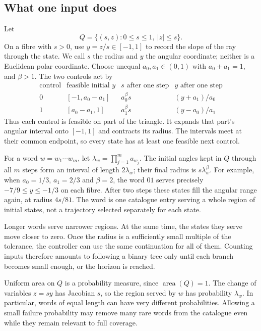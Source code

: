 \documentclass[11pt]{amsart}
\theoremstyle{definition}
\theoremstyle{remark}
\newcommand{\area}{\operatorname{area}}
\numberwithin{equation}{section}
\begin{document}
\subsection{What one input does}
Let
\[
Q=\{(s,z):0\le s\le1,\ |z|\le s\}.
\]
On a fibre with $s>0$, use $y=z/s\in[-1,1]$ to record the
slope of the ray through the state. We call $s$ the radius and
$y$ the angular coordinate; neither is a Euclidean polar coordinate.
Choose unequal $a_0,a_1\in(0,1)$ with $a_0+a_1=1$, and
$\beta>1$. The two controls act by
\[
\begin{array}{c|c|c|c}
\text{control}&\text{feasible initial }y&s\text{ after one step}
                                      &y\text{ after one step}\\ \hline
0&[-1,a_0-a_1]&a_0^\beta s&(y+a_1)/a_0\\
1&[a_0-a_1,1]&a_1^\beta s&(y-a_0)/a_1
\end{array}
\]
Thus each control is feasible on part of the triangle. It expands
that part's angular interval onto $[-1,1]$ and contracts its radius.
The intervals meet at their common endpoint, so every state has
at least one feasible next control.

For a word $w=w_1\cdots w_m$, let
$\lambda_w=\prod_{j=1}^m a_{w_j}$. The initial angles kept
in $Q$ through all $m$ steps form an interval of length
$2\lambda_w$; their final radius is $s\lambda_w^\beta$.
For example, when $a_0=1/3$, $a_1=2/3$ and $\beta=2$,
the word $01$ serves precisely $-7/9\le y\le-1/3$ on each
fibre. After two steps these states fill the angular range again,
at radius $4s/81$. The word is one catalogue entry serving a whole
region of initial states, not a trajectory selected separately
for each state.

Longer words serve narrower regions. At the same time, the states
they serve move closer to zero. Once the radius is a sufficiently
small multiple of the tolerance, the controller can use the same
continuation for all of them. Counting inputs therefore amounts
to following a binary tree only until each branch becomes small
enough, or the horizon is reached.

Uniform area on $Q$ is a probability measure, since $\area(Q)=1$.
The change of variables $z=sy$ has Jacobian $s$, so the region
served by $w$ has probability $\lambda_w$. In particular, words
of equal length can have very different probabilities. Allowing
a small failure probability may remove many rare words from the
catalogue even while they remain relevant to full coverage.
\end{document}
